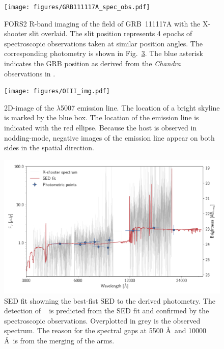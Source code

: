 \documentclass{aa}    %
\begin{document}
\begin{figure}
	\centering
	\texttt{[image: figures/GRB111117A\_spec\_obs.pdf]}
	\caption{
	FORS2 R-band imaging of the field of GRB~111117A with the X-shooter slit overlaid. The slit
	position represents 4 epochs of spectroscopic observations taken at similar
	position angles. The corresponding photometry
	is shown in Fig.~\ref{fig:SED}. The blue asterisk indicates the GRB position as
	derived from the \emph{Chandra} observations in \citet{Sakamoto2013}. 
	}
	\label{fig:spec_setup}
\end{figure}

\begin{figure}
	\centering
	\texttt{[image: figures/OIII\_img.pdf]}
	\caption{2D-image of the \oiii$\lambda$5007 emission line. The location of a bright skyline is marked by the blue box. The location of the emission line is indicated with the red ellipse. Because the host is observed in nodding-mode, negative images of the emission line appear on both sides in the spatial direction.}
	\label{fig:line}
\end{figure}


\begin{figure}
	\centering
	\includegraphics[width=16cm]{figures/SEDspecphot.pdf}
	\caption{SED fit showning the best-fist SED to the derived photometry. The detection of \lya~ is predicted from the SED fit and confirmed by the spectroscopic observations. Overplotted in grey is the observed spectrum. The reason for the spectral gaps at 5500 \AA~and 10000 \AA~is from the merging of the arms.}
	\label{fig:SED}
\end{figure}
\end{document}
